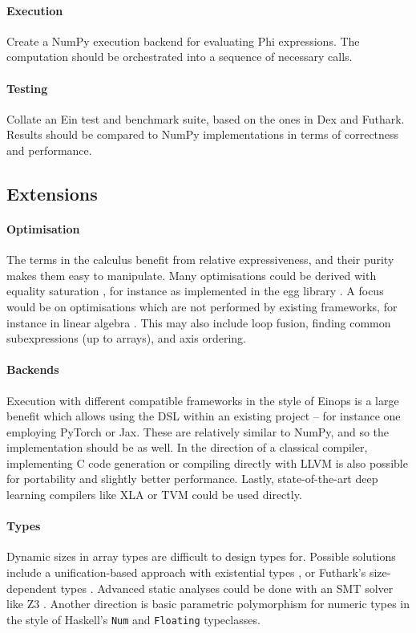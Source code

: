 \paragraph{Execution} Create a NumPy execution backend for evaluating Phi expressions. The computation should be orchestrated into a sequence of necessary calls.

\paragraph{Testing} Collate an Ein test and benchmark suite, based on the ones in Dex and Futhark. Results should be compared to NumPy implementations in terms of correctness and performance.

\subsection{Extensions}

\paragraph{Optimisation} The terms in the calculus benefit from relative expressiveness, and their purity makes them easy to manipulate. Many optimisations could be derived with equality saturation \cite{10.14778/3407790.3407799}, for instance as implemented in the egg library \cite{2021-egg}. A focus would be on optimisations which are not performed by existing frameworks, for instance in linear algebra \cite{9835658}. This may also include loop fusion, finding common subexpressions (up to arrays), and axis ordering.

\paragraph{Backends} Execution with different compatible frameworks in the style of Einops \cite{rogozhnikov2022einops} is a large benefit which allows using the DSL within an existing project -- for instance one employing PyTorch or Jax. These are relatively similar to NumPy, and so the implementation should be as well. In the direction of a classical compiler, implementing C code generation or compiling directly with LLVM is also possible for portability and slightly better performance. Lastly, state-of-the-art deep learning compilers like XLA \cite{50530} or TVM \cite{10.5555/3291168.3291211} could be used directly.

\paragraph{Types} Dynamic sizes in array types are difficult to design types for. Possible solutions include a unification-based approach with existential types \cite{Abe2015ASA}, or Futhark's size-dependent types \cite{10.1145/3460944.3464310}. Advanced static analyses could be done with an SMT solver like Z3 \cite{2008-z3}. Another direction is basic parametric polymorphism for numeric types in the style of Haskell's \texttt{Num} and \texttt{Floating} typeclasses. 

